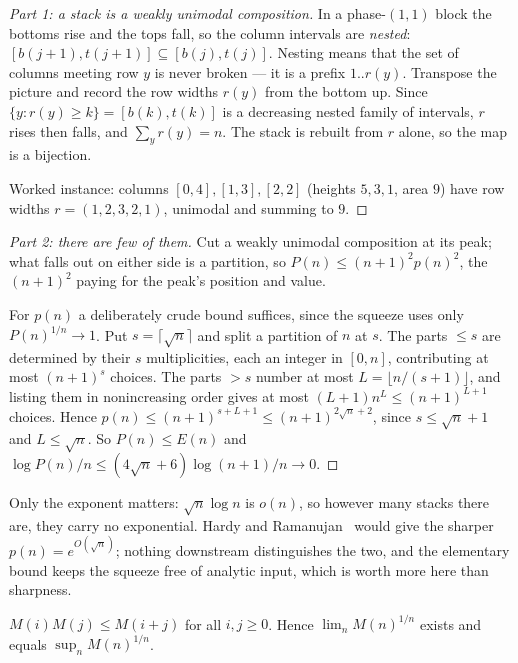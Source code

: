 \documentclass[11pt]{article}
\begin{document}
\begin{proof}[Part 1: a stack is a weakly unimodal composition]
In a phase-$(1,1)$ block the bottoms rise and the tops fall, so the column
intervals are \emph{nested}: $[b(j{+}1),t(j{+}1)] \subseteq [b(j),t(j)]$.
Nesting means that the set of columns meeting row $y$ is never broken --- it is
a prefix $1..r(y)$. Transpose the picture and record the row widths $r(y)$ from
the bottom up. Since $\{y : r(y) \ge k\} = [b(k),t(k)]$ is a decreasing nested
family of intervals, $r$ rises then falls, and $\sum_y r(y) = n$. The stack is
rebuilt from $r$ alone, so the map is a bijection.

Worked instance: columns $[0,4],[1,3],[2,2]$ (heights $5,3,1$, area $9$) have
row widths $r = (1,2,3,2,1)$, unimodal and summing to $9$.
\end{proof}

\begin{proof}[Part 2: there are few of them]
Cut a weakly unimodal composition at its peak; what falls out on either side is
a partition, so $P(n) \le (n{+}1)^2 p(n)^2$, the $(n{+}1)^2$ paying for the
peak's position and value.

For $p(n)$ a deliberately crude bound suffices, since the squeeze uses only
$P(n)^{1/n}\to1$. Put $s = \lceil\sqrt n\rceil$ and split a partition of $n$ at
$s$. The parts $\le s$ are determined by their $s$ multiplicities, each an
integer in $[0,n]$, contributing at most $(n{+}1)^s$ choices. The parts $> s$
number at most $L = \lfloor n/(s{+}1)\rfloor$, and listing them in nonincreasing
order gives at most $(L{+}1)n^L \le (n{+}1)^{L+1}$ choices. Hence
$p(n) \le (n{+}1)^{s+L+1} \le (n{+}1)^{2\sqrt n + 2}$, since $s \le \sqrt n + 1$
and $L \le \sqrt n$. So $P(n) \le E(n)$ and
$\log P(n)/n \le (4\sqrt n + 6)\log(n{+}1)/n \to 0$.
\end{proof}

Only the exponent matters: $\sqrt n \log n$ is $o(n)$, so however many stacks
there are, they carry no exponential. Hardy and
Ramanujan~\cite{hardyRamanujan1918} would give the sharper $p(n) = e^{O(\sqrt
n)}$; nothing downstream distinguishes the two, and the elementary bound keeps
the squeeze free of analytic input, which is worth more here than sharpness.

\begin{lemma}
\label{lem:supermul}
$M(i)M(j) \le M(i+j)$ for all $i,j \ge 0$. Hence $\lim_n M(n)^{1/n}$ exists and
equals $\sup_n M(n)^{1/n}$.
\end{lemma}
\end{document}
